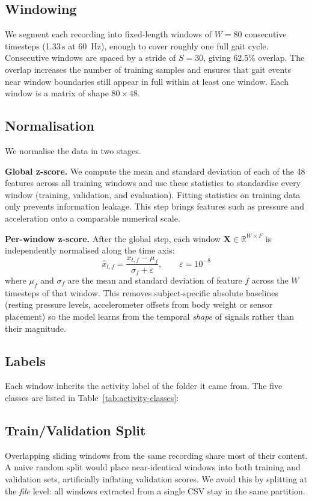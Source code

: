 \documentclass[11pt,a4paper,twocolumn]{article}
\begin{document}
\subsection{Windowing}
We segment each recording into fixed-length windows of $W = 80$ consecutive timesteps (1.33\,s at \SI{60}{Hz}), enough to cover roughly one full gait cycle. Consecutive windows are spaced by a stride of $S = 30$, giving 62.5\% overlap. The overlap increases the number of training samples and ensures that gait events near window boundaries still appear in full within at least one window. Each window is a matrix of shape $80 \times 48$.

\subsection{Normalisation}
We normalise the data in two stages.

\textbf{Global z-score.} We compute the mean and standard deviation of each of the 48 features across all training windows and use these statistics to standardise every window (training, validation, and evaluation). Fitting statistics on training data only prevents information leakage. This step brings features such as pressure and acceleration onto a comparable numerical scale.

\textbf{Per-window z-score.} After the global step, each window $\mathbf{X} \in \mathbb{R}^{W \times F}$ is independently normalised along the time axis:
\begin{equation}
\hat{x}_{t,f} = \frac{x_{t,f} - \mu_f}{\sigma_f + \varepsilon}, \qquad \varepsilon = 10^{-8}
\end{equation}
where $\mu_f$ and $\sigma_f$ are the mean and standard deviation of feature $f$ across the $W$ timesteps of that window. This removes subject-specific absolute baselines (resting pressure levels, accelerometer offsets from body weight or sensor placement) so the model learns from the temporal \emph{shape} of signals rather than their magnitude.

\subsection{Labels}
Each window inherits the activity label of the folder it came from. The five classes are listed in Table~\ref{tab:activity-classes}:



\subsection{Train/Validation Split}
Overlapping sliding windows from the same recording share most of their content. A naive random split would place near-identical windows into both training and validation sets, artificially inflating validation scores. We avoid this by splitting at the \emph{file} level: all windows extracted from a single CSV stay in the same partition.
\end{document}
